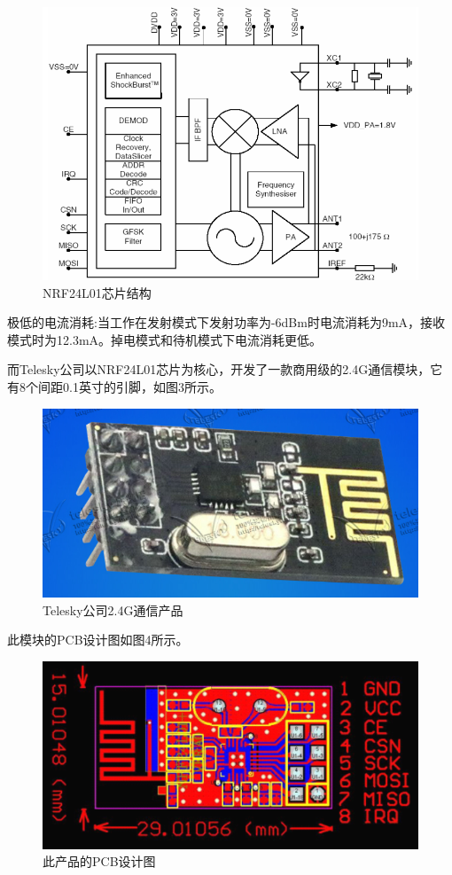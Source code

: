\documentclass[UTF8,a4paper,11pt]{article}
\begin{document}
\begin{figure}[htbp]
    \centering
    \includegraphics[scale=0.6]{p1.png}
    \caption{NRF24L01芯片结构}
\end{figure} 

极低的电流消耗:当工作在发射模式下发射功率为-6dBm时电流消耗为9mA，接收模式时为12.3mA。掉电模式和待机模式下电流消耗更低。

而Telesky公司以NRF24L01芯片为核心，开发了一款商用级的2.4G通信模块，它有8个间距0.1英寸的引脚，如图3所示。

\begin{figure}[htbp]
    \centering
    \includegraphics[scale=0.6]{p2.png}
    \caption{Telesky公司2.4G通信产品}
\end{figure} 

此模块的PCB设计图如图4所示。
\begin{figure}[htbp]
    \centering
    \includegraphics[scale=0.8]{p3.png}
    \caption{此产品的PCB设计图}
\end{figure} 
\end{document}
